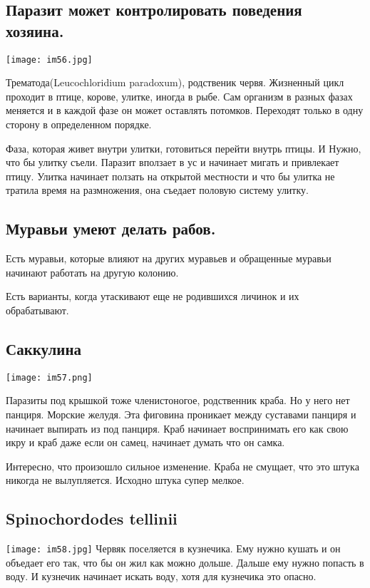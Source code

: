 \subsection{Паразит может контролировать поведения хозяина.}
\texttt{[image: im56.jpg]}

Трематода(Leucochloridium paradoxum), родственик червя.
Жизненный цикл проходит в птице, корове, 
улитке, иногда в рыбе. 
Сам организм в разных фазах меняется и
в каждой фазе он может оставлять потомков. Переходят
только в одну сторону в определенном порядке.

Фаза, которая живет внутри улитки, готовиться перейти внутрь птицы. И
Нужно, что бы улитку съели. Паразит вползает в ус и начинает
мигать и привлекает птицу. Улитка начинает ползать на открытой местности
и что бы улитка не тратила время на размножения, она съедает половую систему улитку.

\subsection{Муравьи умеют делать рабов.}

Есть муравьи, которые влияют на других муравьев и
обращенные муравьи начинают работать на
другую колонию.

Есть варианты, когда утаскивают еще не родившихся личинок и
их обрабатывают.

\subsection{Саккулина}
\texttt{[image: im57.png]}

Паразиты под крышкой тоже членистоногое, родственник краба. Но у него нет
панциря. Морские желудя. Эта фиговина проникает
между суставами панциря и начинает выпирать из под
панциря. Краб начинает воспринимать его как свою икру и
краб даже если он самец, начинает думать что он самка.

Интересно, что произошло сильное изменение. 
Краба не смущает, что это штука никогда 
не вылупляется. Исходно штука супер мелкое.

\subsection{Spinochordodes tellinii}

\texttt{[image: im58.jpg]}
Червяк поселяется в кузнечика. Ему нужно кушать и 
он объедает его так, что бы он жил как можно дольше. 
Дальше ему нужно попасть в воду. И кузнечик начинает 
искать воду, хотя для кузнечика это опасно. 

